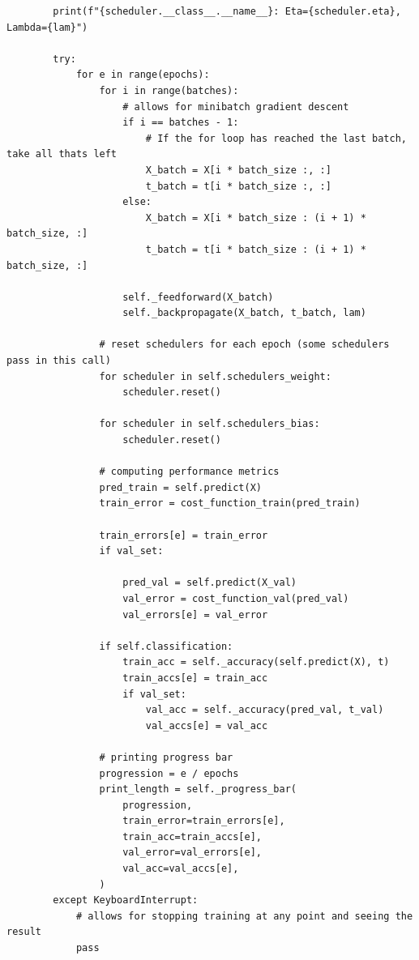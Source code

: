 \documentclass{beamer}
\begin{document}
\begin{frame}
\begin{verbatim}
        print(f"{scheduler.__class__.__name__}: Eta={scheduler.eta}, Lambda={lam}")

        try:
            for e in range(epochs):
                for i in range(batches):
                    # allows for minibatch gradient descent
                    if i == batches - 1:
                        # If the for loop has reached the last batch, take all thats left
                        X_batch = X[i * batch_size :, :]
                        t_batch = t[i * batch_size :, :]
                    else:
                        X_batch = X[i * batch_size : (i + 1) * batch_size, :]
                        t_batch = t[i * batch_size : (i + 1) * batch_size, :]

                    self._feedforward(X_batch)
                    self._backpropagate(X_batch, t_batch, lam)

                # reset schedulers for each epoch (some schedulers pass in this call)
                for scheduler in self.schedulers_weight:
                    scheduler.reset()

                for scheduler in self.schedulers_bias:
                    scheduler.reset()

                # computing performance metrics
                pred_train = self.predict(X)
                train_error = cost_function_train(pred_train)

                train_errors[e] = train_error
                if val_set:
                    
                    pred_val = self.predict(X_val)
                    val_error = cost_function_val(pred_val)
                    val_errors[e] = val_error

                if self.classification:
                    train_acc = self._accuracy(self.predict(X), t)
                    train_accs[e] = train_acc
                    if val_set:
                        val_acc = self._accuracy(pred_val, t_val)
                        val_accs[e] = val_acc

                # printing progress bar
                progression = e / epochs
                print_length = self._progress_bar(
                    progression,
                    train_error=train_errors[e],
                    train_acc=train_accs[e],
                    val_error=val_errors[e],
                    val_acc=val_accs[e],
                )
        except KeyboardInterrupt:
            # allows for stopping training at any point and seeing the result
            pass


\end{verbatim}
\end{frame}
\end{document}
